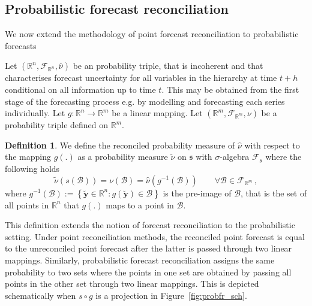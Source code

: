 \documentclass[a4paper, 11pt]{article}
\theoremstyle{theo}
\theoremstyle{definition}
\newtheorem{definition}{Definition}[section]
\begin{document}
\subsection{Probabilistic forecast reconciliation}

We now extend the methodology of point forecast reconciliation to probabilistic forecasts


  Let $(\mathbb{R}^n, \mathscr{F}_{\mathbb{R}^n}, \hat{\nu})$ be an probability triple, that is incoherent and that characterises forecast uncertainty for all variables in the hierarchy at time $t+h$ conditional on all information up to time $t$.  This may be obtained from the first stage of the forecasting process e.g. by modelling and forecasting each series individually.  Let $g:\mathbb{R}^n \rightarrow \mathbb{R}^m $ be a linear mapping.  Let $(\mathbb{R}^m, \mathscr{F}_{\mathbb{R}^m}, \nu)$ be a probability triple defined on $\mathbb{R}^m$.
  \begin{definition} \label{def:reconprob}
  We define the reconciled probability measure of $\hat{\nu}$ with respect to the mapping $g(.)$ as a probability measure $\tilde{\nu}$ on $\mathfrak{s}$ with $\sigma$-algebra $\mathscr{F}_\mathfrak{s}$ where the following holds
  \begin{equation}
  \tilde{\nu}(s(\mathcal{B})) = \nu(\mathcal{B})= \hat{\nu}(g^{-1}(\mathcal{B})) \qquad \forall \mathcal{B} \in \mathscr{F}_{\mathbb{R}^m}\,,
  \end{equation}
  where $g^{-1}(\mathcal{B}):=\left\{\breve{\bm{y}}\in \mathbb{R}^n:g(\breve{\bm{y}})\in \mathcal{B} \right\}$ is the pre-image of $\mathcal{B}$, that is the set of all points in $\mathbb{R}^n$ that $g(.)$ maps to a point in $\mathcal{B}$.
\end{definition}



This definition extends the notion of forecast reconciliation to the probabilistic setting.   Under point reconciliation methods, the reconciled point forecast is equal to the unreconciled point forecast after the latter is passed through two linear mappings. Similarly, probabilistic forecast reconciliation assigns the same probability to two sets where the points in one set are obtained by passing all points in the other set through two linear mappings.  This is depicted schematically when $s\circ g$ is a projection in Figure~\ref{fig:probfr_sch}.
\end{document}
